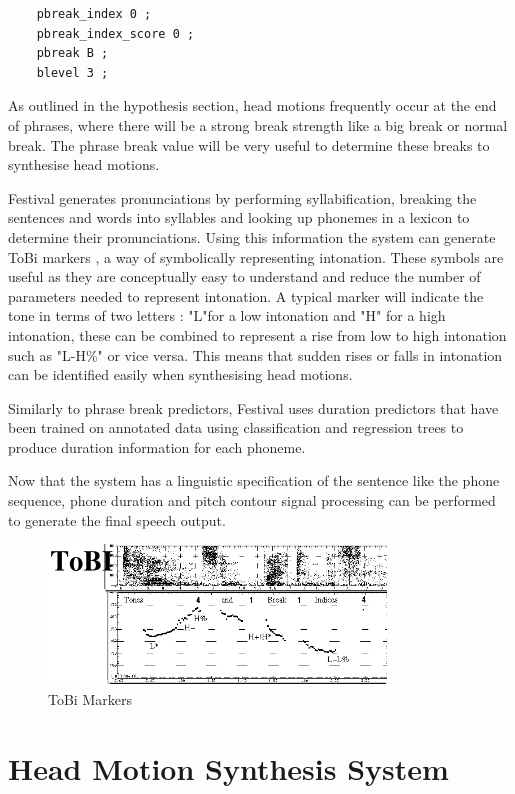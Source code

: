 \documentclass[bsc,frontabs,twoside,singlespacing,parskip]{infthesis}
\begin{document}
\begin{lstlisting}
	pbreak_index 0 ;
	pbreak_index_score 0 ;
	pbreak B ; 
	blevel 3 ; 
\end{lstlisting}

As outlined in the hypothesis section, head motions frequently occur at the end of phrases, where there will be a strong break strength like a big break or normal break. The phrase break value will be very useful to determine these breaks to synthesise head motions.

Festival generates pronunciations by performing syllabification, breaking the sentences and words into syllables and looking up phonemes in a lexicon to determine their pronunciations. Using this information the system can generate ToBi markers \cite{tobi}, a way of symbolically representing intonation. These symbols are useful as they are conceptually easy to understand and reduce the number of parameters needed to represent intonation. A typical marker will indicate the tone in terms of two letters : "L"for a low intonation and "H" for a high intonation, these can be combined to represent a rise from low to high intonation such as "L-H\%" or vice versa.  This means that sudden rises or falls in intonation can be identified easily when synthesising head motions. 

Similarly to phrase break predictors, Festival uses duration predictors that have been trained on annotated data using classification and regression trees to produce duration information for each phoneme.

Now that the system has a linguistic specification of the sentence like the phone sequence, phone duration and pitch contour signal processing can be performed to generate the final speech output.

\begin{figure}[h!]
	\centering
	\includegraphics[width=0.8\textwidth]{tobi.png}
	\caption{ToBi Markers}
\end{figure}

\section{Head Motion Synthesis System}
\end{document}
